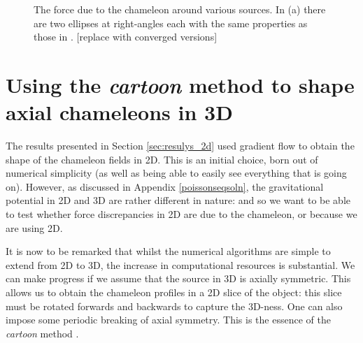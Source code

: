 \documentclass[a4paper, 12pt]{article}
\numberwithin{equation}{section}
\newcommand{\note}[1]{{\color{blue}[#1]}}
\begin{document}
\begin{figure}[!t]
      \begin{center}
      \end{center}
\caption{ The force due to the chameleon around various sources. In (a) there are two ellipses at right-angles each with the same properties as those in .  \note{replace with converged versions}}\label{fig:varioushapes}
\end{figure}

\section{Using the \textit{cartoon} method to shape axial chameleons in 3D}
The results presented in Section \ref{sec:resulys_2d} used gradient flow to obtain the shape of the chameleon fields in 2D. This is an initial choice, born out of numerical simplicity (as well as being able to easily see everything that is going on). However, as discussed in Appendix \ref{poissonseqsoln}, the gravitational potential in 2D and 3D are rather different in nature: and so we want to be able to test whether force discrepancies in 2D are due to the chameleon, or because we are using 2D. 

It is now to be remarked that whilst the numerical algorithms are simple to extend from 2D to 3D, the increase in computational resources is substantial. We can make progress if we assume that the source in 3D is axially symmetric. This allows us to obtain the chameleon profiles in a 2D slice of the object: this slice must be rotated forwards and backwards to capture the 3D-ness. One can also impose some periodic breaking of axial symmetry. This is the essence of the \textit{cartoon} method \cite{Alcubierre:1999ab}. 
\end{document}
